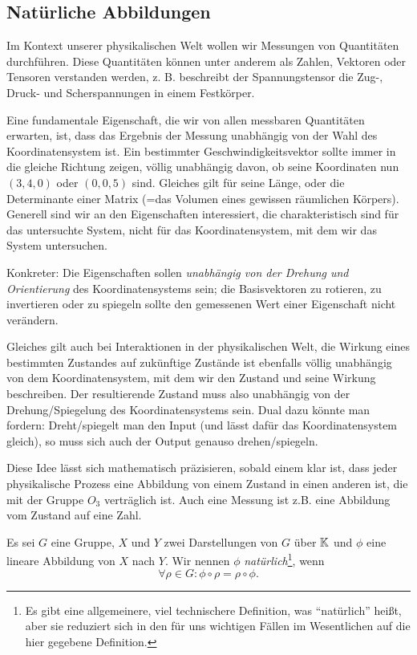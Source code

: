 \subsection{Natürliche Abbildungen}

\begin{remark}
Im Kontext unserer physikalischen Welt wollen wir Messungen von Quantitäten durchführen. Diese Quantitäten können unter anderem als Zahlen, Vektoren oder Tensoren verstanden werden, z. B. beschreibt der Spannungstensor die Zug-, Druck- und Scherspannungen in einem Festkörper.

Eine fundamentale Eigenschaft, die wir von allen messbaren Quantitäten erwarten, ist, dass das Ergebnis der Messung unabhängig von der Wahl des Koordinatensystem ist. Ein bestimmter Geschwindigkeitsvektor sollte immer in die gleiche Richtung zeigen, völlig unabhängig davon, ob seine Koordinaten nun $(3,4,0)$ oder $(0,0,5)$ sind. Gleiches gilt für seine Länge, oder die Determinante einer Matrix (=das Volumen eines gewissen räumlichen Körpers). Generell sind wir an den Eigenschaften interessiert, die charakteristisch sind für das untersuchte System, nicht für das Koordinatensystem, mit dem wir das System untersuchen.

Konkreter: Die Eigenschaften sollen \emph{unabhängig von der Drehung und Orientierung} des Koordinatensystems sein; die Basisvektoren zu rotieren, zu invertieren oder zu spiegeln sollte den gemessenen Wert einer Eigenschaft nicht verändern.

Gleiches gilt auch bei Interaktionen in der physikalischen Welt, die Wirkung eines bestimmten Zustandes auf zukünftige Zustände ist ebenfalls völlig unabhängig von dem Koordinatensystem, mit dem wir den Zustand und seine Wirkung beschreiben. Der resultierende Zustand muss also unabhängig von der Drehung/Spiegelung des Koordinatensystems sein. Dual dazu könnte man fordern: Dreht/spiegelt man den Input (und lässt dafür das Koordinatensystem gleich), so muss sich auch der Output genauso drehen/spiegeln.

Diese Idee lässt sich mathematisch präzisieren, sobald einem klar ist, dass jeder physikalische Prozess eine Abbildung von einem Zustand in einen anderen ist, die mit der Gruppe $O_3$ verträglich ist. Auch eine Messung ist z.B. eine Abbildung vom Zustand auf eine Zahl.
\end{remark}

\begin{definition}
Es sei $G$ eine Gruppe, $X$ und $Y$ zwei Darstellungen von $G$ über $\mathbb{K}$ und $\phi$ eine lineare Abbildung von $X$ nach $Y$. Wir nennen $\phi$ \emph{natürlich}\footnote{Es gibt eine allgemeinere, viel technischere Definition, was \enquote{natürlich} heißt, aber sie reduziert sich in den für uns wichtigen Fällen im Wesentlichen auf die hier gegebene Definition.}, wenn 
	\begin{equation*}
		\forall \rho\in G: \phi \circ \rho = \rho \circ \phi.
	\end{equation*}
\end{definition}

